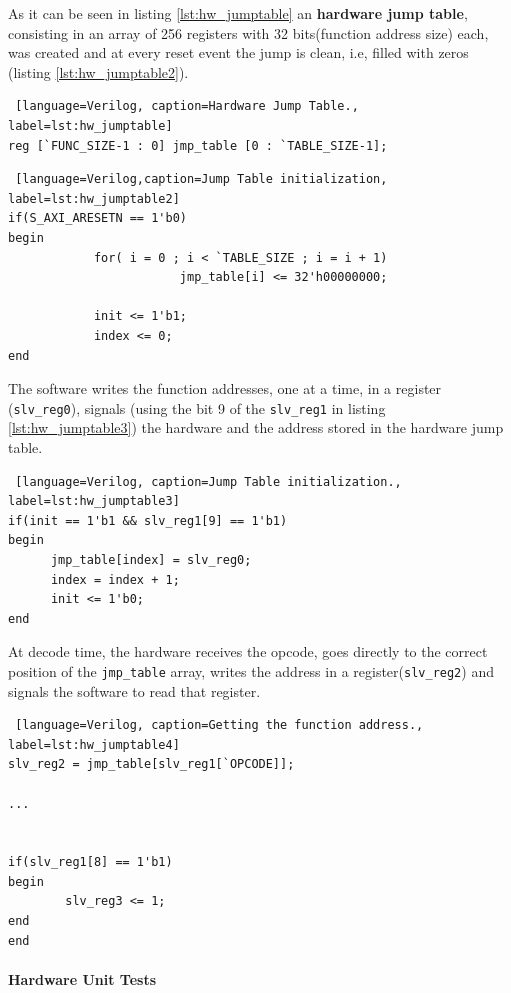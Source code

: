 As it can be seen in listing \ref{lst:hw_jumptable} an \textbf{hardware jump table}, consisting in an array of 256 registers with 32 bits(function address size) each, was created and at every reset event the jump is clean, i.e, filled with zeros (listing \ref{lst:hw_jumptable2}).

\begin{lstlisting} [language=Verilog, caption=Hardware Jump Table., label=lst:hw_jumptable]
reg [`FUNC_SIZE-1 : 0] jmp_table [0 : `TABLE_SIZE-1];
\end{lstlisting}

\begin{lstlisting} [language=Verilog,caption=Jump Table initialization, label=lst:hw_jumptable2]
if(S_AXI_ARESETN == 1'b0)
begin
			for( i = 0 ; i < `TABLE_SIZE ; i = i + 1)
						jmp_table[i] <= 32'h00000000;

			init <= 1'b1;
			index <= 0;         
end
\end{lstlisting}

The software writes the function addresses, one at a time, in a register (\texttt{slv\_reg0}), signals (using the bit 9 of the \texttt{slv\_reg1} in listing \ref{lst:hw_jumptable3}) the hardware and the address stored in the hardware jump table.

\begin{lstlisting} [language=Verilog, caption=Jump Table initialization., label=lst:hw_jumptable3]
if(init == 1'b1 && slv_reg1[9] == 1'b1)
begin
      jmp_table[index] = slv_reg0;
      index = index + 1;
      init <= 1'b0; 
end
\end{lstlisting}

At decode time, the hardware receives the opcode, goes directly to the correct position of the \texttt{jmp\_table} array, writes the address in a register(\texttt{slv\_reg2}) and signals the software to read that register.

\begin{lstlisting} [language=Verilog, caption=Getting the function address., label=lst:hw_jumptable4]
slv_reg2 = jmp_table[slv_reg1[`OPCODE]];

...


if(slv_reg1[8] == 1'b1)
begin           
		slv_reg3 <= 1; 
end
end
\end{lstlisting}

\paragraph{Hardware Unit Tests}

